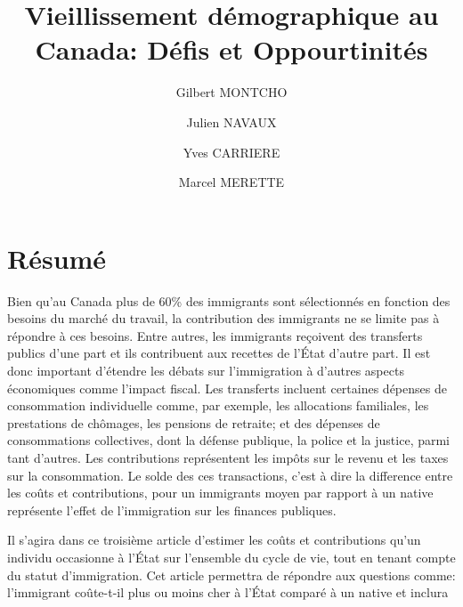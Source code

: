 



\title{Vieillissement démographique au Canada: Défis et Oppourtinités}
\author[1]{Gilbert MONTCHO}
\author[3]{Julien NAVAUX}
\author[1]{Yves CARRIERE}
\author[2]{Marcel MERETTE}



\date{}

\maketitle

\section*{Résumé}



Bien qu'au Canada plus de 60\% des immigrants sont sélectionnés en fonction des besoins du marché du travail, la contribution des immigrants ne se limite pas à répondre à ces besoins. Entre autres, les immigrants reçoivent des transferts publics d'une part et ils contribuent aux recettes de l’État  d’autre part. Il est donc important d'étendre les débats sur l'immigration à d'autres aspects économiques comme l'impact fiscal. Les transferts incluent certaines dépenses de consommation individuelle comme, par exemple, les allocations familiales, les prestations de chômages, les pensions de retraite; et des dépenses de consommations collectives, dont la défense publique, la police et la justice, parmi tant d’autres. Les contributions représentent les impôts sur le revenu et les taxes sur la consommation. Le solde des ces transactions, c'est à dire la difference entre les coûts et contributions, pour un immigrants moyen par rapport à un native représente l'effet de l'immigration sur les finances publiques.


Il s'agira dans ce troisième article d'estimer les coûts et contributions qu'un individu occasionne à l’État sur l'ensemble du cycle de vie, tout en tenant compte du statut d'immigration. Cet article permettra de répondre aux questions comme: l'immigrant coûte-t-il plus ou moins cher à l'État comparé à un native et inclura

